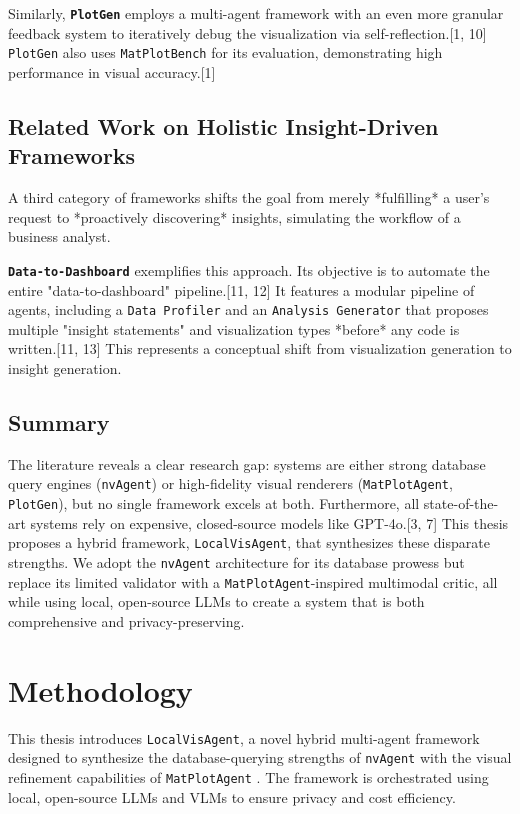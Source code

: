 \documentclass[a4paper,oneside,bibliography=totoc]{scrbook}
\begin{document}
Similarly, \textbf{\texttt{PlotGen}} \cite{goswami2025plotgen} employs a multi-agent framework with an even more granular feedback system to iteratively debug the visualization via self-reflection.[1, 10] \texttt{PlotGen} also uses \texttt{MatPlotBench} for its evaluation, demonstrating high performance in visual accuracy.[1]

\section{Related Work on Holistic Insight-Driven Frameworks}

A third category of frameworks shifts the goal from merely *fulfilling* a user's request to *proactively discovering* insights, simulating the workflow of a business analyst.

\textbf{\texttt{Data-to-Dashboard}} \cite{zhang2025data} exemplifies this approach. Its objective is to automate the entire "data-to-dashboard" pipeline.[11, 12] It features a modular pipeline of agents, including a \texttt{Data Profiler} and an \texttt{Analysis Generator} that proposes multiple "insight statements" and visualization types *before* any code is written.[11, 13] This represents a conceptual shift from visualization generation to insight generation.

\section{Summary}

The literature reveals a clear research gap: systems are either strong database query engines (\texttt{nvAgent}) or high-fidelity visual renderers (\texttt{MatPlotAgent}, \texttt{PlotGen}), but no single framework excels at both. Furthermore, all state-of-the-art systems rely on expensive, closed-source models like GPT-4o.[3, 7] This thesis proposes a hybrid framework, \texttt{LocalVisAgent}, that synthesizes these disparate strengths. We adopt the \texttt{nvAgent} architecture for its database prowess but replace its limited validator with a \texttt{MatPlotAgent}-inspired multimodal critic, all while using local, open-source LLMs to create a system that is both comprehensive and privacy-preserving.

\chapter{Methodology}

This thesis introduces \texttt{LocalVisAgent}, a novel hybrid multi-agent framework designed to synthesize the database-querying strengths of \texttt{nvAgent} \cite{ouyang2025nvagent} with the visual refinement capabilities of \texttt{MatPlotAgent} \cite{yang2024matplotagent}. The framework is orchestrated using local, open-source LLMs and VLMs to ensure privacy and cost efficiency.
\end{document}
